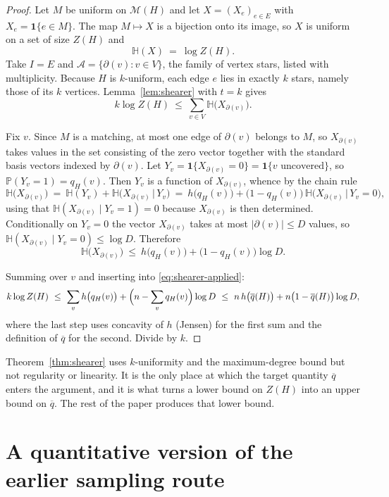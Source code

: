 \documentclass[11pt,a4paper]{amsart}
\theoremstyle{plain}
\theoremstyle{definition}
\theoremstyle{remark}
\newcommand{\VV}{V}
\newcommand{\EE}{E}
\newcommand{\Mat}{\mathcal{M}}
\newcommand{\PP}{\mathbb{P}}
\newcommand{\Ent}{\mathbb{H}}
\newcommand{\qbar}{\overline{q}}
\newcommand{\dg}{\partial}
\begin{document}
\begin{proof}
Let $M$ be uniform on $\Mat(H)$ and let $X=(X_e)_{e\in \EE}$ with
$X_e=\mathbf{1}\{e\in M\}$. The map $M\mapsto X$ is a bijection onto its image, so $X$ is
uniform on a set of size $Z(H)$ and
\[
  \Ent(X)\ =\ \log Z(H).
\]
Take $I=\EE$ and $\mathcal{A}=\{\dg(v):v\in \VV\}$, the family of vertex stars, listed
with multiplicity. Because $H$ is $k$-uniform, each edge $e$ lies in exactly $k$ stars,
namely those of its $k$ vertices. Lemma~\ref{lem:shearer} with $t=k$ gives
\begin{equation}
\label{eq:shearer-applied}
  k\log Z(H)\ \le\ \sum_{v\in \VV}\Ent\bigl(X_{\dg(v)}\bigr).
\end{equation}

Fix $v$. Since $M$ is a matching, at most one edge of $\dg(v)$ belongs to $M$, so
$X_{\dg(v)}$ takes values in the set consisting of the zero vector together with the
standard basis vectors indexed by $\dg(v)$. Let
$Y_v=\mathbf{1}\{X_{\dg(v)}=0\}=\mathbf{1}\{v\text{ uncovered}\}$, so
$\PP(Y_v=1)=q_H(v)$. Then $Y_v$ is a function of $X_{\dg(v)}$, whence by the chain rule
\[
  \Ent\bigl(X_{\dg(v)}\bigr)
  \ =\ \Ent(Y_v)+\Ent\bigl(X_{\dg(v)}\,\big|\,Y_v\bigr)
  \ =\ h\bigl(q_H(v)\bigr)+\bigl(1-q_H(v)\bigr)\,
        \Ent\bigl(X_{\dg(v)}\,\big|\,Y_v=0\bigr),
\]
using that $\Ent(X_{\dg(v)}\mid Y_v=1)=0$ because $X_{\dg(v)}$ is then determined.
Conditionally on $Y_v=0$ the vector $X_{\dg(v)}$ takes at most $|\dg(v)|\le D$ values, so
$\Ent(X_{\dg(v)}\mid Y_v=0)\le\log D$. Therefore
\[
  \Ent\bigl(X_{\dg(v)}\bigr)\ \le\ h\bigl(q_H(v)\bigr)+\bigl(1-q_H(v)\bigr)\log D .
\]

Summing over $v$ and inserting into \eqref{eq:shearer-applied}:
\[
  k\log Z(H)\ \le\ \sum_{v}h\bigl(q_H(v)\bigr)+\Bigl(n-\sum_v q_H(v)\Bigr)\log D
  \ \le\ n\,h\bigl(\qbar(H)\bigr)+n\bigl(1-\qbar(H)\bigr)\log D ,
\]
where the last step uses concavity of $h$ (Jensen) for the first sum and the definition of
$\qbar$ for the second. Divide by $k$.
\end{proof}

Theorem~\ref{thm:shearer} uses $k$-uniformity and the maximum-degree bound but not
regularity or linearity. It is
the only place at which the target quantity $\qbar$ enters the argument, and it is what
turns a lower bound on $Z(H)$ into an upper bound on $\qbar$. The rest of the paper
produces that lower bound.

\section{A quantitative version of the earlier sampling route}
\label{sec:nibble}
\end{document}

